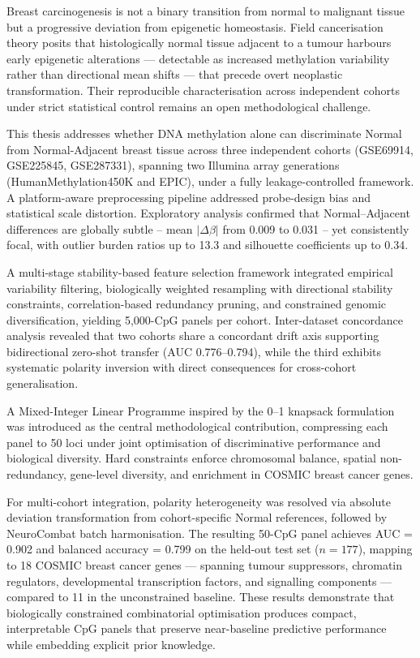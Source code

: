 Breast carcinogenesis is not a binary transition from normal to malignant tissue
but a progressive deviation from epigenetic homeostasis. Field cancerisation theory
posits that histologically normal tissue adjacent to a tumour harbours early epigenetic
alterations — detectable as increased methylation variability rather than directional
mean shifts — that precede overt neoplastic transformation. Their reproducible
characterisation across independent cohorts under strict statistical control remains
an open methodological challenge.

This thesis addresses whether DNA methylation alone can discriminate Normal from
Normal-Adjacent breast tissue across three independent cohorts (GSE69914, GSE225845,
GSE287331), spanning two Illumina array generations (HumanMethylation450K and EPIC),
under a fully leakage-controlled framework. A platform-aware preprocessing pipeline
addressed probe-design bias and statistical scale distortion. Exploratory analysis
confirmed that Normal--Adjacent differences are globally subtle -- mean $|\Delta\beta|$
from 0.009 to 0.031 -- yet consistently focal, with outlier burden ratios up to 13.3
and silhouette coefficients up to 0.34.

A multi-stage stability-based feature selection framework integrated empirical
variability filtering, biologically weighted resampling with directional stability
constraints, correlation-based redundancy pruning, and constrained genomic
diversification, yielding 5,000-CpG panels per cohort. Inter-dataset concordance
analysis revealed that two cohorts share a concordant drift axis supporting
bidirectional zero-shot transfer (AUC 0.776--0.794), while the third exhibits
systematic polarity inversion with direct consequences for cross-cohort generalisation.

A Mixed-Integer Linear Programme inspired by the 0--1 knapsack formulation
was introduced as the central methodological contribution, compressing each panel
to 50 loci under joint optimisation of discriminative performance and biological
diversity. Hard constraints enforce chromosomal balance, spatial non-redundancy,
gene-level diversity, and enrichment in COSMIC breast cancer genes.

For multi-cohort integration, polarity heterogeneity was resolved via absolute
deviation transformation from cohort-specific Normal references, followed by
NeuroCombat batch harmonisation. The resulting 50-CpG panel achieves AUC = 0.902
and balanced accuracy = 0.799 on the held-out test set ($n = 177$), mapping to
18 COSMIC breast cancer genes --- spanning tumour suppressors, chromatin regulators,
developmental transcription factors, and signalling components --- compared to 11
in the unconstrained baseline. These results demonstrate that biologically constrained
combinatorial optimisation produces compact, interpretable CpG panels that preserve
near-baseline predictive performance while embedding explicit prior knowledge.